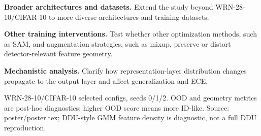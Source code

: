\documentclass[final]{article}
\newcommand{\PaperRightBullet}[1]{%
  \begin{minipage}[t]{5mm}
    {\fontsize{15.6pt}{20.5pt}\selectfont\color{WantedAccent}\textbullet}
  \end{minipage}%
  \hspace{2mm}%
  \begin{minipage}[t]{\dimexpr\linewidth-7mm\relax}
    {\fontsize{15.6pt}{20.5pt}\selectfont\color{WantedText}\RaggedRight #1}
  \end{minipage}\par\vspace{1.35mm}
}
\begin{document}
\begin{WantedPoster}
{{    \vspace{2.5mm}
    \PaperRightBullet{\textbf{Broader architectures and datasets.} Extend the study beyond WRN-28-10/CIFAR-10 to more diverse architectures and training datasets.}
    \PaperRightBullet{\textbf{Other training interventions.} Test whether other optimization methods, such as SAM, and augmentation strategies, such as mixup, preserve or distort detector-relevant feature geometry.}
    \PaperRightBullet{\textbf{Mechanistic analysis.} Clarify how representation-layer distribution changes propagate to the output layer and affect generalization and ECE.}
  }
}

\WantedFooter
  {WRN-28-10/CIFAR-10 selected configs, seeds 0/1/2. OOD and geometry metrics are post-hoc diagnostics; higher OOD score means more ID-like.}
  {Source: poster/poster.tex; DDU-style GMM feature density is diagnostic, not a full DDU reproduction.}

\end{WantedPoster}
\end{document}
